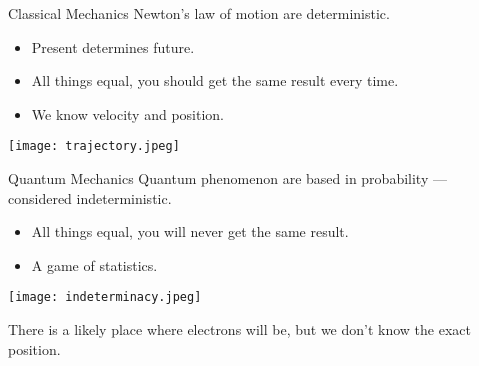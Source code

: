 \documentclass[handout,notes=hide]{beamer}
\begin{document}

\begin{frame}{Classical Mechanics}
	Newton's law of motion are \alert{deterministic}.
			\begin{itemize}
				\item Present determines future.
				\item All things equal, you should get the same
					result every time.
				\item We know velocity and position.
			\end{itemize}
			\begin{center}
				\texttt{[image: trajectory.jpeg]}
			\end{center}
		\end{frame}

\begin{frame}{Quantum Mechanics}
	Quantum phenomenon are based in probability --- considered
	\alert{indeterministic}.
		\begin{itemize}
			\item All things equal, you will \alert{never}
				get the same result.
			\item A game of statistics.
		\end{itemize}

		\begin{center}
			\texttt{[image: indeterminacy.jpeg]}
		\end{center}

		\begin{alertenv}
			There is a likely place where electrons will be,
			but we don't know the exact position.
		\end{alertenv}
\end{frame}
\end{document}
